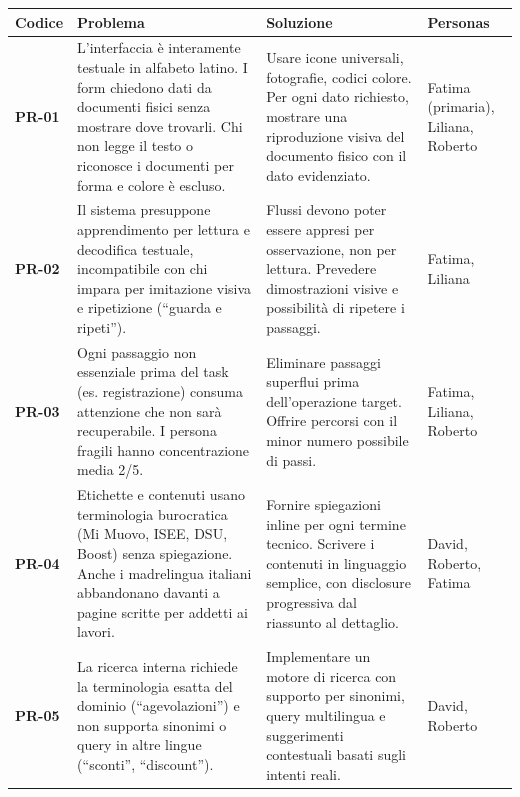 ﻿\documentclass[11pt,a4paper]{article}
\begin{document}
\begin{tcolorbox}[base]
{\small
\renewcommand{\arraystretch}{1.3}
\begin{tabular}{|p{1.2cm}|p{5cm}|p{5cm}|p{2.8cm}|}
\hline
\textbf{Codice} & \textbf{Problema} & \textbf{Soluzione} & \textbf{Personas} \\
\hline
\textbf{PR-01} & L'interfaccia è interamente testuale in alfabeto
latino. I form chiedono dati da documenti fisici senza mostrare dove
trovarli. Chi non legge il testo o riconosce i documenti per forma e
colore è escluso. & Usare icone universali, fotografie, codici colore.
Per ogni dato richiesto, mostrare una riproduzione visiva del documento
fisico con il dato evidenziato. & Fatima (primaria), Liliana, Roberto \\
\hline
\textbf{PR-02} & Il sistema presuppone apprendimento per lettura e
decodifica testuale, incompatibile con chi impara per imitazione
visiva e ripetizione (``guarda e ripeti''). & Flussi devono poter
essere appresi per osservazione, non per lettura. Prevedere
dimostrazioni visive e possibilità di ripetere i passaggi. & Fatima,
Liliana \\
\hline
\textbf{PR-03} & Ogni passaggio non essenziale prima del task (es.
registrazione) consuma attenzione che non sarà recuperabile. I persona
fragili hanno concentrazione media 2/5. & Eliminare passaggi superflui
prima dell'operazione target. Offrire percorsi con il minor numero
possibile di passi. & Fatima, Liliana, Roberto \\
\hline
\textbf{PR-04} & Etichette e contenuti usano terminologia burocratica
(Mi Muovo, ISEE, DSU, Boost) senza spiegazione. Anche i madrelingua
italiani abbandonano davanti a pagine scritte per addetti ai lavori. &
Fornire spiegazioni inline per ogni termine tecnico. Scrivere i
contenuti in linguaggio semplice, con disclosure progressiva dal
riassunto al dettaglio. & David, Roberto, Fatima \\
\hline
\textbf{PR-05} & La ricerca interna richiede la terminologia esatta del
dominio (``agevolazioni'') e non supporta sinonimi o query in altre
lingue (``sconti'', ``discount''). & Implementare un motore di ricerca
con supporto per sinonimi, query multilingua e suggerimenti
contestuali basati sugli intenti reali. & David, Roberto \\
\hline
\end{tabular}}
\end{tcolorbox}

\vspace{0.5cm}
\end{document}
